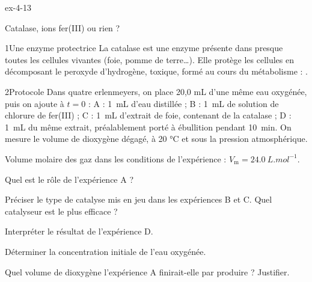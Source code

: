 \begin{blocLivre}{ex-4-13}
\begin{exercice}[3]{Catalase, ions fer(III) ou rien ?}
\begin{docu}{1}{Une enzyme protectrice}
La catalase est une enzyme présente dans presque toutes les cellules vivantes (foie, pomme de terre…). Elle protège
les cellules en décomposant le peroxyde d'hydrogène, toxique, formé au cours du métabolisme :
.
\end{docu}
\begin{docu}{2}{Protocole}
Dans quatre erlenmeyers, on place 20,0 mL d'une même eau oxygénée, puis on ajoute à $t=0$ : A : 1~mL d'eau
distillée ; B : 1~mL de solution de chlorure de fer(III) ; C : 1~mL d'extrait de foie, contenant de la catalase ;
D : 1~mL du même extrait, préalablement porté à ébullition pendant 10~min. On mesure le volume de dioxygène dégagé,
à 20 °C et sous la pression atmosphérique.
\end{docu}
\begin{donnees}
Volume molaire des gaz dans les conditions de l'expérience : $V_\mathrm{m}=\qty{24,0}{L.mol^{-1}}$.
\end{donnees}
\begin{questions}
\item Quel est le rôle de l'expérience A ?
\item Préciser le type de catalyse mis en jeu dans les expériences B et C. Quel catalyseur est le plus efficace ?
\item Interpréter le résultat de l'expérience D.
\item \initiative Déterminer la concentration initiale de l'eau oxygénée.
\item Quel volume de dioxygène l'expérience A finirait-elle par produire ? Justifier.
\end{questions}
\end{exercice}
\end{blocLivre}

